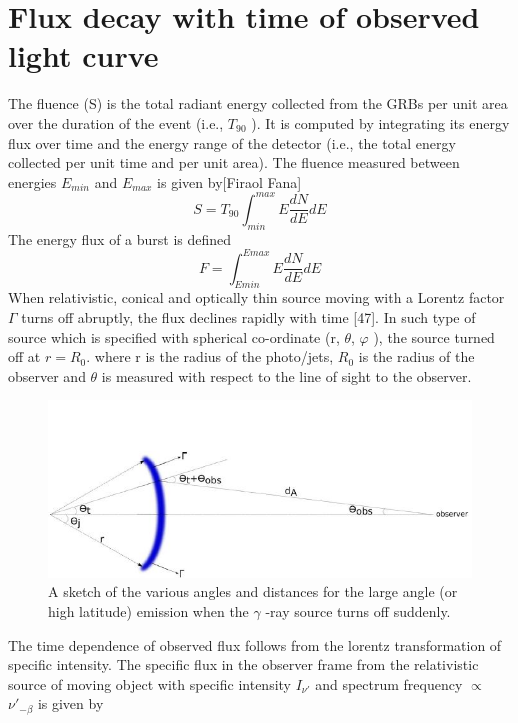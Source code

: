\section{Flux decay with time of observed light curve }
The fluence (S) is the total radiant energy collected from the GRBs per unit area over the duration of the event (i.e., $ T_{90} $ ). It is computed by integrating its energy flux over time and the energy range of the detector (i.e., the total energy collected per unit time and per unit area). The fluence measured between energies $ E_{min} $ and $ E_{max} $ is given by[Firaol Fana]
\begin{equation}
S= T_{90}\int_{min}^{max}E\frac{dN}{dE}dE
\end{equation}
The energy flux of a burst is defined
\begin{equation}
F=\int_{Emin}^{Emax}E\frac{dN}{dE}dE
\end{equation}
When relativistic, conical and optically thin source moving with a Lorentz factor     $ \Gamma $ turns off abruptly, the flux declines rapidly with time [47]. In such type of source which is specified with spherical co-ordinate (r, $\theta $,  $ \varphi $ ), the source turned off at $ r =  R_{0} $. where r is the radius of the photo/jets, $ R_{0} $ is the radius of the observer and $ \theta $ is measured with respect to the line of sight to the observer.
\begin{figure}[h]
\begin{center}
\includegraphics[scale=0.5]{Figures/Flux.png}
\caption{ A sketch of the various angles and distances for the large angle (or high
latitude) emission when the $\gamma$ -ray source turns off suddenly.}
\end{center}
\end{figure}
The time dependence of observed flux follows from the lorentz transformation of
specific intensity. The specific flux in the observer frame from the relativistic source of moving object with specific intensity $ I_{\nu'} $ and spectrum frequency $\propto $ $ \nu'_{-\beta} $ is given by
